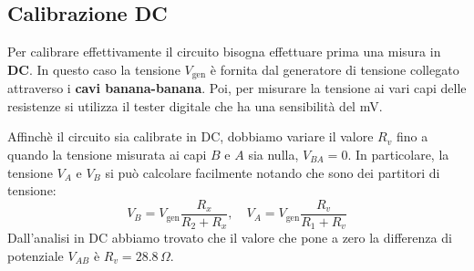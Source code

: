 \documentclass[../main/main.tex]{subfiles}
\begin{document}
\subsection{Calibrazione DC}
Per calibrare effettivamente il circuito bisogna effettuare prima una misura in \textbf{DC}. In questo caso la tensione \( V_{\text{gen}} \) è fornita dal generatore di tensione collegato attraverso i \textbf{cavi banana-banana}. Poi, per misurare la tensione ai vari capi delle resistenze si utilizza il tester digitale che ha una sensibilità del mV.

Affinchè il circuito sia calibrate in DC, dobbiamo variare il valore \( R_v \) fino a quando la tensione misurata ai capi \( B \) e \( A \) sia nulla, \( V_{BA} = 0\).
In particolare, la tensione \( V_{A} \) e \( V_{B} \) si può calcolare facilmente notando che sono dei partitori di tensione:
\begin{equation*}
  V_B = V_{\text{gen}} \frac{R_x}{R_2 + R_x}, \quad  V_A = V_{\text{gen}} \frac{R_v}{R_1+R_v}
\end{equation*}
Dall'analisi in DC abbiamo trovato che il valore che pone a zero la differenza di potenziale \( V_{AB}\) è \( R_v=28.8 \, \Omega  \).
\end{document}
